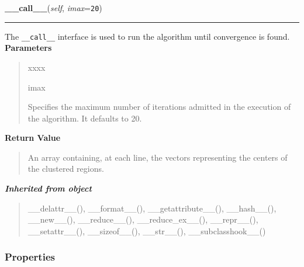 \hspace{.8\funcindent}\begin{boxedminipage}{\funcwidth}

    \raggedright \textbf{\_\_call\_\_}(\textit{self}, \textit{imax}={\tt 20})

    \vspace{-1.5ex}

    \rule{\textwidth}{0.5\fboxrule}
\setlength{\parskip}{2ex}

The \texttt{\_\_call\_\_} interface is used to run the algorithm until
convergence is found.
\setlength{\parskip}{1ex}
      \textbf{Parameters}
      \vspace{-1ex}

      \begin{quote}
        \begin{Ventry}{xxxx}

          \item[imax]


Specifies the maximum number of iterations admitted in the execution
of the algorithm. It defaults to 20.
        \end{Ventry}

      \end{quote}

      \textbf{Return Value}
    \vspace{-1ex}

      \begin{quote}

An array containing, at each line, the vectors representing the
centers of the clustered regions.
      \end{quote}

    \end{boxedminipage}


\large{\textbf{\textit{Inherited from object}}}

\begin{quote}
\_\_delattr\_\_(), \_\_format\_\_(), \_\_getattribute\_\_(), \_\_hash\_\_(), \_\_new\_\_(), \_\_reduce\_\_(), \_\_reduce\_ex\_\_(), \_\_repr\_\_(), \_\_setattr\_\_(), \_\_sizeof\_\_(), \_\_str\_\_(), \_\_subclasshook\_\_()
\end{quote}


  \subsubsection{Properties}

